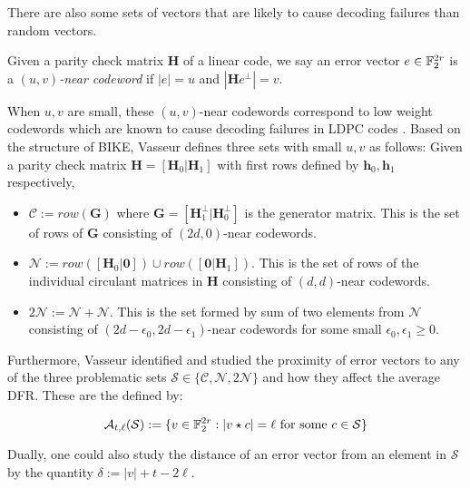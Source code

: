 There are also some sets of vectors that are likely to cause decoding failures than random vectors.

\begin{defn}
Given a parity check matrix $\mathbf{H}$ of a linear code, we say an error vector $e \in \mathbb{F}_2^{2r}$ is a \textit{$(u,v)$-near codeword} if $|e| = u$ and $|\mathbf{H}e^\perp|=v$.
\end{defn}

When $u, v$ are small, these $(u,v)$-near codewords correspond to low weight codewords which are known to cause decoding failures in LDPC codes \cite{Richardson03}. Based on the structure of BIKE, Vasseur defines three sets with small $u,v$ as follows: Given a parity check matrix $\mathbf{H} = [\mathbf{H}_0 | \mathbf{H}_1 ]$ with first rows defined by $\mathbf{h}_0, \mathbf{h}_1$ respectively,

\begin{itemize}
\item $\mathcal{C} := row(\mathbf{G})$ where $\mathbf{G} = [ \mathbf{H}_1^\perp | \mathbf{H}_0^\perp ]$ is the generator matrix. This is the set of rows of $\mathbf{G}$ consisting of $(2d,0)$-near codewords.
\item $\mathcal{N} := row([\mathbf{H}_0 | \mathbf{0}]) \cup row([\mathbf{0} | \mathbf{H}_1])$. This is the set of rows of the individual circulant matrices in $\mathbf{H}$ consisting of $(d,d)$-near codewords.
\item $2\mathcal{N} := \mathcal{N} + \mathcal{N}$. This is the set formed by sum of two elements from $\mathcal{N}$ consisting of $(2d - \epsilon_0, 2d - \epsilon_1)$-near codewords for some small $\epsilon_0,\epsilon_1\geq 0$.
\end{itemize}

Furthermore, Vasseur identified and studied the proximity of error vectors to any of the three problematic sets $\mathcal{S} \in \{ \mathcal{C}, \mathcal{N}, 2\mathcal{N} \}$ and how they affect the average DFR. These are the defined by:

\[
\mathcal{A}_{t, \ell}(\mathcal{S}) := \{ v \in \mathbb{F}_2^{2r} : |v \star c | = \ell \text{ for some } c \in \mathcal{S} \}
\]

Dually, one could also study the distance of an error vector from an element in $\mathcal{S}$ by the quantity $\delta := |v| + t - 2\ell$.
